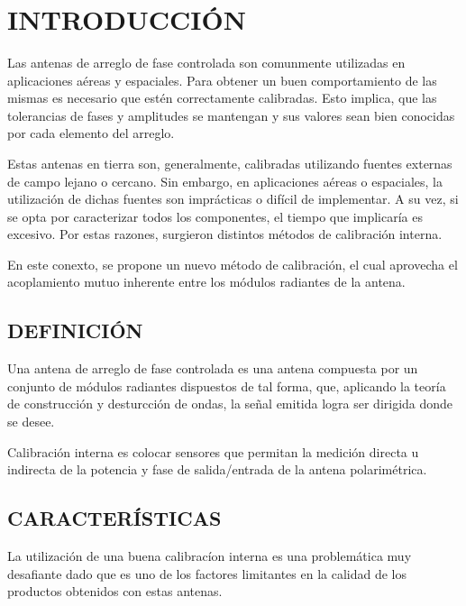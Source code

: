 \documentclass[a4paper,10pt]{article}
\title{  }
\begin{document}
	\maketitle %
	\newpage

	\tableofcontents %
	\newpage

	\section{INTRODUCCIÓN}
		Las antenas de arreglo de fase controlada son comunmente utilizadas en 
	aplicaciones aéreas y espaciales. Para obtener un buen comportamiento de las
	mismas es necesario que estén correctamente calibradas. Esto implica, que 
	las tolerancias de fases y amplitudes se mantengan y sus valores sean bien 
	conocidas por cada elemento del arreglo.
	
		Estas antenas en tierra son, generalmente, calibradas utilizando fuentes
    externas de campo lejano o cercano. Sin embargo, en aplicaciones aéreas o 
    espaciales, la utilización de dichas fuentes son imprácticas o difícil de 
    implementar. A su vez, si se opta por caracterizar todos los componentes, el
    tiempo que implicaría es excesivo. Por estas razones, surgieron distintos 
    métodos de calibración interna.

		En este conexto, se propone un nuevo método de calibración, el cual 
	aprovecha el acoplamiento mutuo inherente entre los módulos radiantes de la 
	antena.

	\subsection{DEFINICIÓN}
		Una antena de arreglo de fase controlada es una antena compuesta por un
	conjunto de módulos radiantes dispuestos de tal forma, que, aplicando la
	teoría de construcción y desturcción de ondas, la señal emitida logra ser 
	dirigida donde se desee.
		
		Calibración interna es colocar sensores que permitan la medición directa
	u indirecta de la potencia y fase de salida/entrada de la antena 
	polarimétrica.
		
	\subsection{CARACTERÍSTICAS}
		La utilización de una buena calibracíon interna es una problemática muy
	desafiante dado que es uno de los factores limitantes en la calidad de los 
	productos obtenidos con estas antenas.
\end{document}
